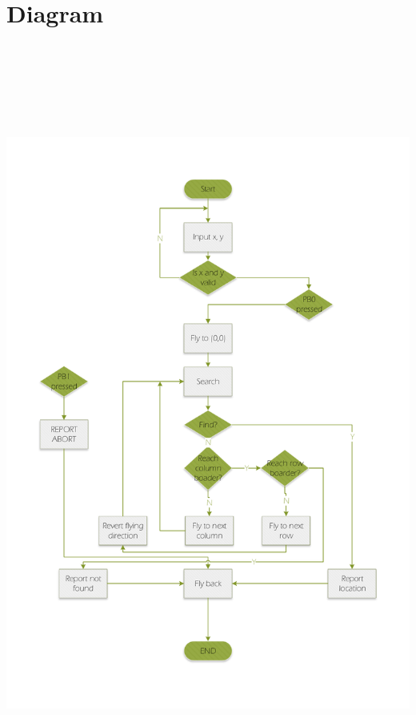 \documentclass[a4paper, 12 pt]{report}
\begin{document}
\section{Diagram}
\includegraphics[height = 250mm]{diagram.pdf}


\newpage
\end{document}
